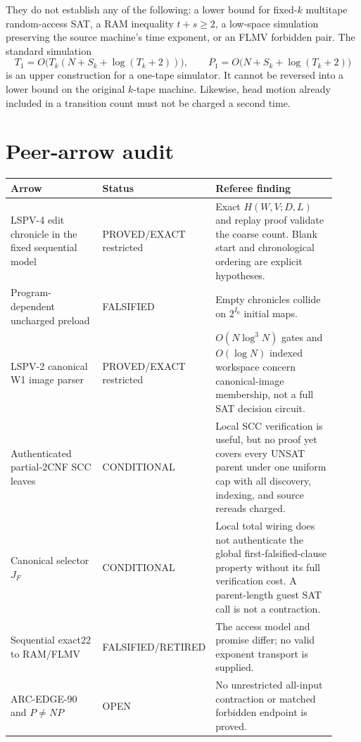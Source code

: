 \documentclass[11pt]{article}
\begin{document}
They do not establish any of the following: a lower bound for fixed-$k$ multitape random-access SAT, a RAM inequality $t+s\ge2$, a low-space simulation preserving the source machine's time exponent, or an FLMV forbidden pair.  The standard simulation
\[
T_1=O\bigl(T_k(N+S_k+\log(T_k+2))\bigr),\qquad
P_1=O\bigl(N+S_k+\log(T_k+2)\bigr)
\]
is an upper construction for a one-tape simulator.  It cannot be reversed into a lower bound on the original $k$-tape machine.  Likewise, head motion already included in a transition count must not be charged a second time.

\section{Peer-arrow audit}

\begin{center}
\begin{tabular}{>{\raggedright\arraybackslash}p{0.31\linewidth}p{0.18\linewidth}>{\raggedright\arraybackslash}p{0.43\linewidth}}
\toprule
Arrow & Status & Referee finding\\
\midrule
LSPV-4 edit chronicle in the fixed sequential model & PROVED/EXACT restricted & Exact $H(W,V;D,L)$ and replay proof validate the coarse count.  Blank start and chronological ordering are explicit hypotheses.\\
Program-dependent uncharged preload & FALSIFIED & Empty chronicles collide on $2^{I_0}$ initial maps.\\
LSPV-2 canonical W1 image parser & PROVED/EXACT restricted & $O(N\log^3N)$ gates and $O(\log N)$ indexed workspace concern canonical-image membership, not a full SAT decision circuit.\\
Authenticated partial-2CNF SCC leaves & CONDITIONAL & Local SCC verification is useful, but no proof yet covers every UNSAT parent under one uniform cap with all discovery, indexing, and source rereads charged.\\
Canonical selector $J_F$ & CONDITIONAL & Local total wiring does not authenticate the global first-falsified-clause property without its full verification cost.  A parent-length guest SAT call is not a contraction.\\
Sequential exact22 to RAM/FLMV & FALSIFIED/RETIRED & The access model and promise differ; no valid exponent transport is supplied.\\
ARC-EDGE-90 and $P\ne NP$ & OPEN & No unrestricted all-input contraction or matched forbidden endpoint is proved.\\
\bottomrule
\end{tabular}
\end{center}
\end{document}
